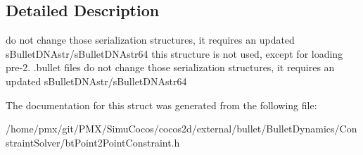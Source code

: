 \subsection{Detailed Description}
do not change those serialization structures, it requires an updated s\+Bullet\+D\+N\+Astr/s\+Bullet\+D\+N\+Astr64 this structure is not used, except for loading pre-\/2. .bullet files do not change those serialization structures, it requires an updated s\+Bullet\+D\+N\+Astr/s\+Bullet\+D\+N\+Astr64 

The documentation for this struct was generated from the following file\+:\begin{DoxyCompactItemize}
\item 
/home/pmx/git/\+P\+M\+X/\+Simu\+Cocos/cocos2d/external/bullet/\+Bullet\+Dynamics/\+Constraint\+Solver/bt\+Point2\+Point\+Constraint.\+h\end{DoxyCompactItemize}
